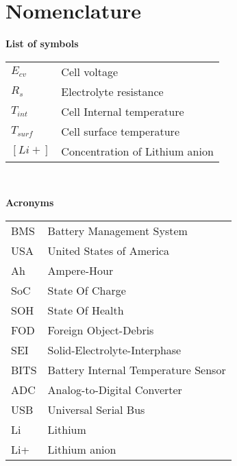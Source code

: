 \chapter*{Nomenclature}

\textbf{List of symbols} \vspace{0.3in} \\
\begin{tabular}{ll}
$E_{cv}$ & Cell voltage  \\
$R_s$ & Electrolyte resistance \\
$T_{int}$ & Cell Internal temperature  \\
$T_{surf}$ & Cell surface temperature  \\
$[Li+]$ & Concentration of Lithium anion \\
\end{tabular}\\

\vspace{1.5in}

\textbf{Acronyms} \vspace{0.3in} \\
\begin{tabular}{ll}
BMS & Battery Management System\\
USA & United States of America \\
Ah & Ampere-Hour \\
SoC & State Of Charge\\
SOH & State Of Health\\
FOD& Foreign Object-Debris\\
SEI& Solid-Electrolyte-Interphase\\
BITS & Battery Internal Temperature Sensor\\
ADC& Analog-to-Digital Converter\\
USB & Universal Serial Bus\\
Li & Lithium\\
Li+ & Lithium anion
\end{tabular}
